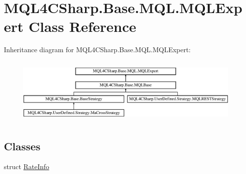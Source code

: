 \hypertarget{class_m_q_l4_c_sharp_1_1_base_1_1_m_q_l_1_1_m_q_l_expert}{}\section{M\+Q\+L4\+C\+Sharp.\+Base.\+M\+Q\+L.\+M\+Q\+L\+Expert Class Reference}
\label{class_m_q_l4_c_sharp_1_1_base_1_1_m_q_l_1_1_m_q_l_expert}
Inheritance diagram for M\+Q\+L4\+C\+Sharp.\+Base.\+M\+Q\+L.\+M\+Q\+L\+Expert\+:\begin{figure}[H]
\begin{center}
\leavevmode
\includegraphics[height=3.363364cm]{class_m_q_l4_c_sharp_1_1_base_1_1_m_q_l_1_1_m_q_l_expert}
\end{center}
\end{figure}
\subsection*{Classes}
\begin{DoxyCompactItemize}
\item 
struct \hyperlink{struct_m_q_l4_c_sharp_1_1_base_1_1_m_q_l_1_1_m_q_l_expert_1_1_rate_info}{Rate\+Info}
\end{DoxyCompactItemize}
